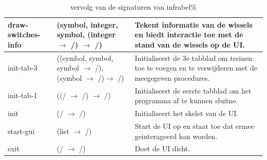 \documentclass{article}
\begin{document}
\begin{table}[h!]
\begin{tabular}{|p{2.9cm}|p{4cm}|p{6.1cm}|}
                \hline
                draw-switches-info & (symbol, integer, symbol, (integer $\rightarrow$ /) $\rightarrow$ /) & Tekent informatie van de wissels en biedt interactie toe met de stand van de wissels op de UI.\\
                \hline
                init-tab-3 & ((symbol, symbol, symbol $\rightarrow$ /), (symbol $\rightarrow$ /)$\rightarrow$ /) & Initialiseert de 3e tabblad om treinen toe te voegen en te verwijderen met de meegegeven procedures.\\
                \hline
                init-tab-1 & ((/ $\rightarrow$ /) $\rightarrow$ /) & Initialiseert de eerste tabblad om het programma af te kunnen sluitne. \\
                \hline
                init & (/ $\rightarrow$ /) & Initialiseert het skelet van de UI.\\
                \hline
                start-gui & (list $\rightarrow$ /) & Start de UI op en staat toe dat ermee geinterageerd kan worden.\\
                \hline
                exit & (/ $\rightarrow$ /) & Doet de UI dicht.\\
                \hline
        \end{tabular}
        \caption{vervolg van de signaturen van infrabel\%}
\end{table}
\end{document}
